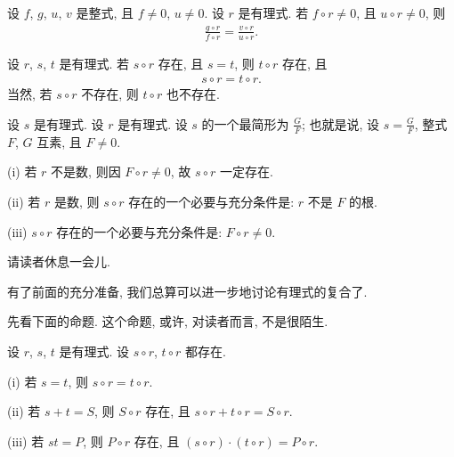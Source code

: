 \begin{proposition}
    设 $f$, $g$, $u$, $v$ 是整式, 且 $f \neq 0$, $u \neq 0$. 设 $r$ 是有理式. 若 $f \circ r \neq 0$, 且 $u \circ r \neq 0$, 则
    \begin{align*}
        \frac{g \circ r}{f \circ r} = \frac{v \circ r}{u \circ r}.
    \end{align*}
\end{proposition}

\begin{proposition}
    设 $r$, $s$, $t$ 是有理式. 若 $s \circ r$ 存在, 且 $s = t$, 则 $t \circ r$ 存在, 且
    \begin{align*}
        s \circ r = t \circ r.
    \end{align*}
    当然, 若 $s \circ r$ 不存在, 则 $t \circ r$ 也不存在.
\end{proposition}

\begin{proposition}
    设 $s$ 是有理式. 设 $r$ 是有理式. 设 $s$ 的一个最简形为 $\frac{G}{F}$; 也就是说, 设 $s = \frac{G}{F}$, 整式 $F$, $G$ 互素, 且 $F \neq 0$.

    (i) 若 $r$ 不是数, 则因 $F \circ r \neq 0$, 故 $s \circ r$ 一定存在.

    (ii) 若 $r$ 是数, 则 $s \circ r$ 存在的一个必要与充分条件是: $r$ 不是 $F$ 的根.

    (iii) $s \circ r$ 存在的一个必要与充分条件是: $F \circ r \neq 0$.
\end{proposition}

请读者休息一会儿.

\myLine

有了前面的充分准备, 我们总算可以进一步地讨论有理式的复合了.

先看下面的命题. 这个命题, 或许, 对读者而言, 不是很陌生.

\begin{proposition}
    设 $r$, $s$, $t$ 是有理式. 设 $s \circ r$, $t \circ r$ 都存在.

    (i) 若 $s = t$, 则 $s \circ r = t \circ r$.

    (ii) 若 $s + t = S$, 则 $S \circ r$ 存在, 且 $s \circ r + t \circ r = S \circ r$.

    (iii) 若 $st = P$, 则 $P \circ r$ 存在, 且 $(s \circ r) \cdot (t \circ r) = P \circ r$.
\end{proposition}

